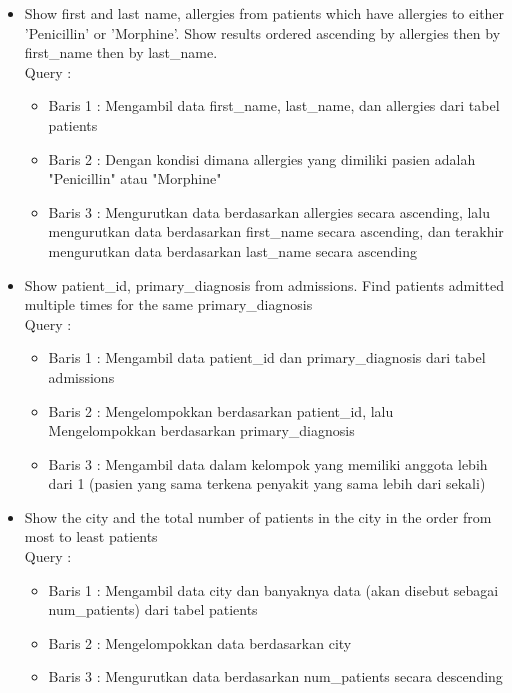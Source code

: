 \documentclass[]{article}
\begin{document}
\begin{itemize}
        \item Show first and last name, allergies from patients which have allergies to either 'Penicillin' or 'Morphine'. Show results ordered ascending by allergies then by first\_name then by last\_name.
        \\Query :
        
        \begin{itemize}
            \item Baris 1 : Mengambil data first\_name, last\_name, dan allergies dari tabel patients
            \item Baris 2 : Dengan kondisi dimana allergies yang dimiliki pasien adalah "Penicillin" atau "Morphine"
            \item Baris 3 : Mengurutkan data berdasarkan allergies secara ascending, lalu mengurutkan data berdasarkan first\_name secara ascending, dan terakhir mengurutkan data berdasarkan last\_name secara ascending
        \end{itemize}

        \item Show patient\_id, primary\_diagnosis from admissions. Find patients admitted multiple times for the same primary\_diagnosis
        \\Query :
        
        \begin{itemize}
            \item Baris 1 : Mengambil data patient\_id dan primary\_diagnosis dari tabel admissions
            \item Baris 2 : Mengelompokkan berdasarkan patient\_id, lalu Mengelompokkan berdasarkan primary\_diagnosis
            \item Baris 3 : Mengambil data dalam kelompok yang memiliki anggota lebih dari 1 (pasien yang sama terkena penyakit yang sama lebih dari sekali)
        \end{itemize}

        \item Show the city and the total number of patients in the city in the order from most to least patients
        \\Query :
        
        \begin{itemize}
            \item Baris 1 : Mengambil data city dan banyaknya data (akan disebut sebagai num\_patients) dari tabel patients
            \item Baris 2 : Mengelompokkan data berdasarkan city
            \item Baris 3 : Mengurutkan data berdasarkan num\_patients secara descending
        \end{itemize}


\end{itemize}
\end{document}
